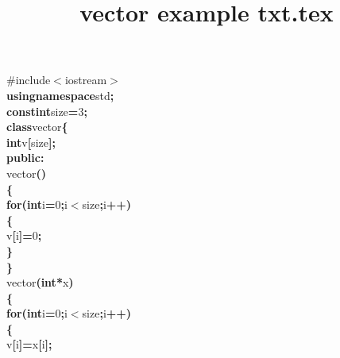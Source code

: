 \documentclass[a4paper, 10pt]{article}
\title{vector example txt.tex}
\newcommand\SPC{\hspace*{0.6em}}
\newcommand\TAB{\hspace*{1.2em}}
\newcommand{\CppAIdentifier}[1]{#1}
\newcommand{\CppANumber}[1]{\textcolor[rgb]{0.5,0,0.5}{#1}}
\newcommand{\CppAPreprocessor}[1]{\textcolor[rgb]{0,0.5,0}{#1}}
\newcommand{\CppAReservedWord}[1]{\textbf{#1}}
\newcommand{\CppASpace}[1]{\colorbox[rgb]{1,1,1}{#1}}
\newcommand{\CppASymbol}[1]{\textbf{\textcolor[rgb]{1,0,0}{#1}}}
\begin{document}
\begin{ttfamily}
\noindent
\CppAPreprocessor{\#include$<$iostream$>$}\\
\CppAReservedWord{using}\CppASpace{\SPC }\CppAReservedWord{namespace}\CppASpace{\SPC }\CppAIdentifier{std}\CppASymbol{;}\\
\CppAReservedWord{const}\CppASpace{\SPC }\CppAReservedWord{int}\CppASpace{\SPC }\CppAIdentifier{size}\CppASymbol{=}\CppANumber{3}\CppASymbol{;}\\
\CppAReservedWord{class}\CppASpace{\SPC }\CppAIdentifier{vector}\CppASymbol{\{}\\
\CppASpace{\TAB }\CppAReservedWord{int}\CppASpace{\SPC }\CppAIdentifier{v}\CppASymbol{[}\CppAIdentifier{size}\CppASymbol{]}\CppASymbol{;}\\
\CppASpace{\TAB }\CppAReservedWord{public}\CppASymbol{:}\\
\CppASpace{\TAB \TAB }\CppAIdentifier{vector}\CppASymbol{(}\CppASymbol{)}\\
\CppASpace{\TAB \TAB }\CppASymbol{\{}\\
\CppASpace{\TAB \TAB \TAB }\CppAReservedWord{for}\CppASymbol{(}\CppAReservedWord{int}\CppASpace{\SPC }\CppAIdentifier{i}\CppASymbol{=}\CppANumber{0}\CppASymbol{;}\CppAIdentifier{i}\CppASymbol{$<$}\CppAIdentifier{size}\CppASymbol{;}\CppAIdentifier{i}\CppASymbol{++}\CppASymbol{)}\\
\CppASpace{\TAB \TAB \TAB }\CppASymbol{\{}\\
\CppASpace{\TAB \TAB \TAB \TAB }\CppAIdentifier{v}\CppASymbol{[}\CppAIdentifier{i}\CppASymbol{]}\CppASymbol{=}\CppANumber{0}\CppASymbol{;}\\
\CppASpace{\TAB \TAB \TAB }\CppASymbol{\}}\\
\CppASpace{\TAB \TAB }\CppASymbol{\}}\\
\CppASpace{\TAB \TAB }\CppAIdentifier{vector}\CppASymbol{(}\CppAReservedWord{int}\CppASpace{\SPC }\CppASymbol{*}\CppAIdentifier{x}\CppASymbol{)}\\
\CppASpace{\TAB \TAB }\CppASymbol{\{}\\
\CppASpace{\TAB \TAB \TAB }\CppAReservedWord{for}\CppASymbol{(}\CppAReservedWord{int}\CppASpace{\SPC }\CppAIdentifier{i}\CppASymbol{=}\CppANumber{0}\CppASymbol{;}\CppAIdentifier{i}\CppASymbol{$<$}\CppAIdentifier{size}\CppASymbol{;}\CppAIdentifier{i}\CppASymbol{++}\CppASymbol{)}\\
\CppASpace{\TAB \TAB \TAB }\CppASymbol{\{}\\
\CppASpace{\TAB \TAB \TAB \TAB }\CppAIdentifier{v}\CppASymbol{[}\CppAIdentifier{i}\CppASymbol{]}\CppASymbol{=}\CppAIdentifier{x}\CppASymbol{[}\CppAIdentifier{i}\CppASymbol{]}\CppASymbol{;}\\

\end{ttfamily}
\end{document}
